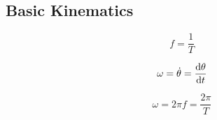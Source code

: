 \subsection{Basic Kinematics}%
\label{sub:basic-kinematics}

\begin{multicols}{3}
    
    \begin{CheatsheetEntryFrame}

        \begin{equation*}
            f = \frac{1}{T}
        \end{equation*}

        \begin{equation*}
            \omega = \dot{\theta} = \frac{\mathrm{d}{\theta}}{\mathrm{d}{t}}
        \end{equation*}

        \begin{equation*}
            \omega = 2 \pi f = \frac{2 \pi}{T}
        \end{equation*}

    \end{CheatsheetEntryFrame}

\end{multicols}
